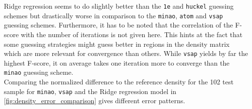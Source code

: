 \begin{table}[h]
    \centering
    \caption{Comparison of different guessing schemes for 102 (20\%) test samples from the  subset from QM9 \parencite{ref:article1_qm9}. The F-score is calculated using the Fock matrix prediction from the Ridge regression model and various guessing schemes implemented in \textsc{PySCF}. The number of iterations until convergence is shown as well as the percentage samples not converging within 50 iterations.}
    \label{tab:fscore_comparison}
\end{table}
Ridge regression seems to do slightly better than the \texttt{1e} and \texttt{huckel} guessing schemes but drastically worse in comparison to the \texttt{minao}, \texttt{atom} and \texttt{vsap} guessing schemes. Furthermore, it has to be noted that the correlation of the F-score with the number of iterations is not given here. This hints at the fact that some guessing strategies might guess better in regions in the density matrix which are more relevant for convergence than others. While \texttt{vsap} yields by far the highest F-score, it on average takes one iteration more to converge than the \texttt{minao} guessing scheme. \\
Comparing the normalized difference to the reference density for the 102 test sample for \texttt{minao}, \texttt{vsap} and the Ridge regression model in \autoref{fig:density_error_comparison} gives different error patterns.  



